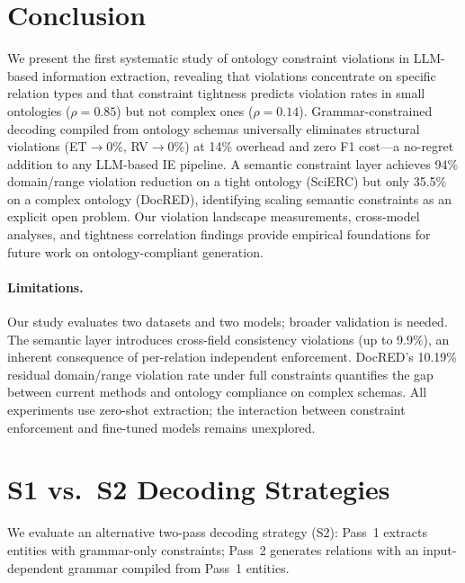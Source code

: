 \documentclass[11pt,a4paper]{article}
\begin{document}
\section{Conclusion}
\label{sec:conclusion}

We present the first systematic study of ontology constraint violations in LLM-based information extraction, revealing that violations concentrate on specific relation types and that constraint tightness predicts violation rates in small ontologies ($\rho{=}0.85$) but not complex ones ($\rho{=}0.14$).
Grammar-constrained decoding compiled from ontology schemas universally eliminates structural violations (ET${\to}$0\%, RV${\to}$0\%) at 14\% overhead and zero F1 cost---a no-regret addition to any LLM-based IE pipeline.
A semantic constraint layer achieves 94\% domain/range violation reduction on a tight ontology (SciERC) but only 35.5\% on a complex ontology (DocRED), identifying scaling semantic constraints as an explicit open problem.
Our violation landscape measurements, cross-model analyses, and tightness correlation findings provide empirical foundations for future work on ontology-compliant generation.

\paragraph{Limitations.}
Our study evaluates two datasets and two models; broader validation is needed.
The semantic layer introduces cross-field consistency violations (up to 9.9\%), an inherent consequence of per-relation independent enforcement.
DocRED's 10.19\% residual domain/range violation rate under full constraints quantifies the gap between current methods and ontology compliance on complex schemas.
All experiments use zero-shot extraction; the interaction between constraint enforcement and fine-tuned models remains unexplored.

\appendix
\section{S1 vs.\ S2 Decoding Strategies}
\label{app:s1s2}

We evaluate an alternative two-pass decoding strategy (S2): Pass~1 extracts entities with grammar-only constraints; Pass~2 generates relations with an input-dependent grammar compiled from Pass~1 entities.
\end{document}
